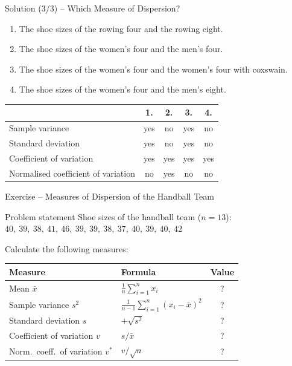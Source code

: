 \documentclass[aspectratio=169,11pt]{beamer}
\begin{document}
\begin{frame}{Solution (3/3) -- Which Measure of Dispersion?}
  \begin{enumerate}
    \item The shoe sizes of the rowing four and the rowing eight.
    \item The shoe sizes of the women's four and the men's four.
    \item The shoe sizes of the women's four and the women's four with coxswain.
    \item The shoe sizes of the women's four and the men's eight.
  \end{enumerate}

  \vspace{0.6em}
  \begin{center}
    \renewcommand{\arraystretch}{1.3}
    \begin{tabular}{lcccc}
      \toprule
       & \textbf{1.} & \textbf{2.} & \textbf{3.} & \textbf{4.} \\
      \midrule
      Sample variance                     & yes & no  & yes & no \\
      Standard deviation                  & yes & no  & yes & no \\
      Coefficient of variation            & yes & yes & yes & yes \\
      Normalised coefficient of variation & no  & yes & no  & no \\
      \bottomrule
    \end{tabular}
  \end{center}
\end{frame}

\begin{frame}{Exercise -- Measures of Dispersion of the Handball Team}
  \begin{block}{Problem statement}
    Shoe sizes of the handball team ($n = 13$): \
    $40,\ 39,\ 38,\ 41,\ 46,\ 39,\ 39,\ 38,\ 37,\ 40,\ 39,\ 40,\ 42$

    \medskip
    Calculate the following measures:
    \begin{center}
      \renewcommand{\arraystretch}{1.2}
      \begin{tabular}{llc}
        \toprule
        \textbf{Measure} & \textbf{Formula} & \textbf{Value} \\
        \midrule
        Mean $\bar{x}$ & $\frac{1}{n}\sum_{i=1}^{n} x_i$ & ? \\
        Sample variance $s^2$ & $\frac{1}{n-1}\sum_{i=1}^{n}(x_i - \bar{x})^2$ & ? \\
        Standard deviation $s$ & $+\sqrt{s^2}$ & ? \\
        Coefficient of variation $v$ & $s / \bar{x}$ & ? \\
        Norm.\ coeff.\ of variation $v^*$ & $v / \sqrt{n}$ & ? \\
        \bottomrule
      \end{tabular}
    \end{center}
  \end{block}
\end{frame}
\end{document}
